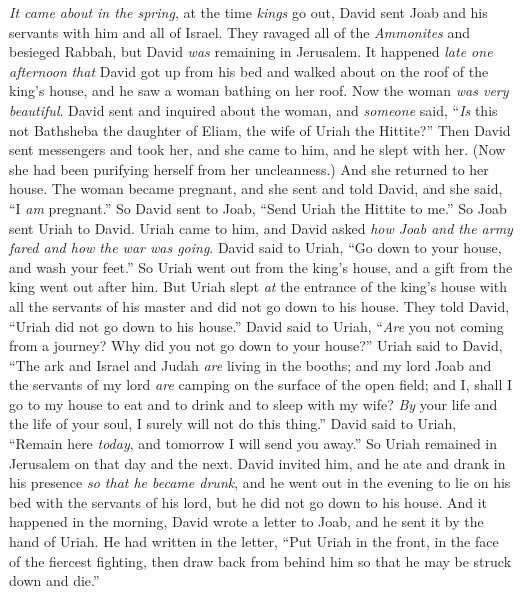 \begin{biblechapter} %
 \textit{It came about in the spring}, at the time \textit{kings} go out, David sent Joab and his servants with him and all of Israel. They ravaged all of the \textit{Ammonites} and besieged Rabbah, but David \textit{was} remaining in Jerusalem.
\verse It happened \textit{late one afternoon} \textit{that} David got up from his bed and walked about on the roof of the king’s house, and he saw a woman bathing on her roof. Now the woman \textit{was very beautiful}.
\verse David sent and inquired about the woman, and \textit{someone} said, “\textit{Is} this not Bathsheba the daughter of Eliam, the wife of Uriah the Hittite?”
\verse Then David sent messengers and took her, and she came to him, and he slept with her. (Now she had been purifying herself from her uncleanness.) And she returned to her house.
\verse The woman became pregnant, and she sent and told David, and she said, “I \textit{am} pregnant.”
\verse So David sent to Joab, “Send Uriah the Hittite to me.” So Joab sent Uriah to David.
\verse Uriah came to him, and David asked \textit{how Joab and the army fared and how the war was going}.
\verse David said to Uriah, “Go down to your house, and wash your feet.” So Uriah went out from the king’s house, and a gift from the king went out after him.
\verse But Uriah slept \textit{at} the entrance of the king’s house with all the servants of his master and did not go down to his house.
\verse They told David, “Uriah did not go down to his house.” David said to Uriah, “\textit{Are} you not coming from a journey? Why did you not go down to your house?”
\verse Uriah said to David, “The ark and Israel and Judah \textit{are} living in the booths; and my lord Joab and the servants of my lord \textit{are} camping on the surface of the open field; and I, shall I go to my house to eat and to drink and to sleep with my wife? \textit{By} your life and the life of your soul, I surely will not do this thing.”
\verse David said to Uriah, “Remain here \textit{today}, and tomorrow I will send you away.” So Uriah remained in Jerusalem on that day and the next.
\verse David invited him, and he ate and drank in his presence \textit{so that he became drunk}, and he went out in the evening to lie on his bed with the servants of his lord, but he did not go down to his house.
\verse And it happened in the morning, David wrote a letter to Joab, and he sent it by the hand of Uriah.
\verse He had written in the letter, “Put Uriah in the front, in the face of the fiercest fighting, then draw back from behind him so that he may be struck down and die.”

\end{biblechapter}
